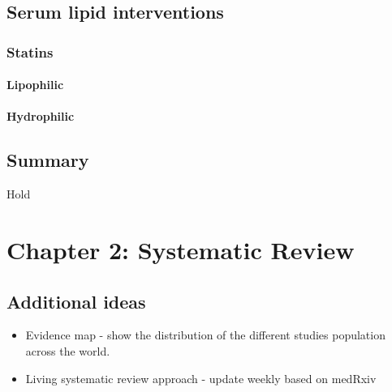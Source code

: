 \documentclass[a4paper, nobind]{templates/ociamthesis}
\providecommand{\tightlist}{%
  \setlength{\itemsep}{0pt}\setlength{\parskip}{0pt}}
\begin{document}
\hypertarget{serum-lipid-interventions}{%
\section{Serum lipid interventions}\label{serum-lipid-interventions}}

\hypertarget{statins}{%
\subsection{Statins}\label{statins}}

\hypertarget{lipophilic}{%
\subsubsection{Lipophilic}\label{lipophilic}}

\hypertarget{hydrophilic}{%
\subsubsection{Hydrophilic}\label{hydrophilic}}

\hypertarget{summary-1}{%
\section{Summary}\label{summary-1}}

\begin{savequote}
Hold
\end{savequote}



\hypertarget{sys-rev-heading}{%
\chapter{Chapter 2: Systematic Review}\label{sys-rev-heading}}

\minitoc 

\hypertarget{additional-ideas}{%
\section{Additional ideas}\label{additional-ideas}}

\begin{itemize}
\tightlist
\item
  Evidence map - show the distribution of the different studies population across the world.
\item
  Living systematic review approach - update weekly based on medRxiv
\end{itemize}
\end{document}
